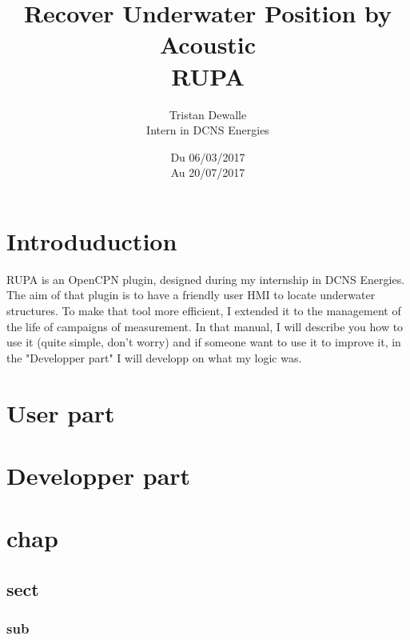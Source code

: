\documentclass[11pt]{report}
\title{Recover Underwater Position by Acoustic \\ RUPA}
\author{Tristan Dewalle \\ Intern in DCNS Energies}
\date{Du 06/03/2017\\Au 20/07/2017}
\begin{document}
    \maketitle
	\tableofcontents
	\chapter{Introduduction}
	 RUPA is an OpenCPN plugin, designed during my internship in DCNS Energies. The aim of that plugin is to 
	 have a friendly user HMI to locate underwater structures. To make that tool more efficient, I extended it 
	 to the management of the life of campaigns of measurement. In that manual, I will describe you how to use it
	 (quite simple, don't worry) and if someone want to use it to improve it, in the "Developper part" I will 
	 developp on what my logic was.
	\chapter{User part}
	\chapter{Developper part}
\iffalse		
\chapter{chap}
	\section{sect}
		\subsection{sub}
		\begin{itemize}
		\end{itemize}
		
		\begin{enumerate}
		\end{enumerate}
		
\end{document}
